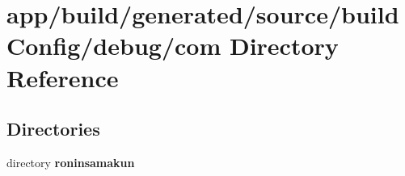 \section{app/build/generated/source/build\+Config/debug/com Directory Reference}
\label{dir_e66da13a3ede1da572a47f25d96a67de}
\subsection*{Directories}
\begin{DoxyCompactItemize}
\item 
directory {\bf roninsamakun}
\end{DoxyCompactItemize}
